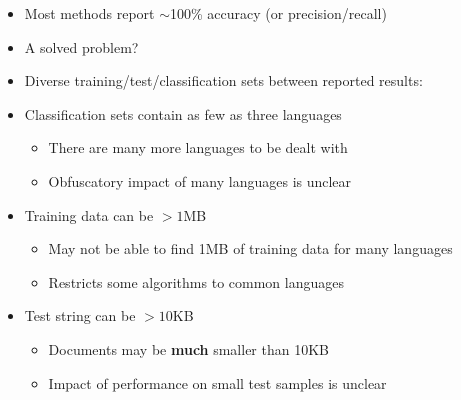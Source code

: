 \documentclass[a4paper,landscape,headrule,footrule,xetex]{foils}
\begin{document}

\begin{itemize}
\item Most methods report $\sim$100\% accuracy (or precision/recall)
\item A solved problem?
\end{itemize}





\begin{itemize}
\item Diverse training/test/classification sets between reported results:
\item Classification sets contain as few as three languages
\begin{itemize}
\item There are many more languages to be dealt with
\item Obfuscatory impact of many languages is unclear
\end{itemize}
\item Training data can be $>1$MB
\begin{itemize}
\item May not be able to find 1MB of training data for many languages
\item Restricts some algorithms to common languages
\end{itemize}
\pagebreak
\item Test string can be $>10$KB
\begin{itemize}
\item Documents may be \textbf{much} smaller than 10KB
\item Impact of performance on small test samples is unclear
\end{itemize}
\end{itemize}









\end{document}
